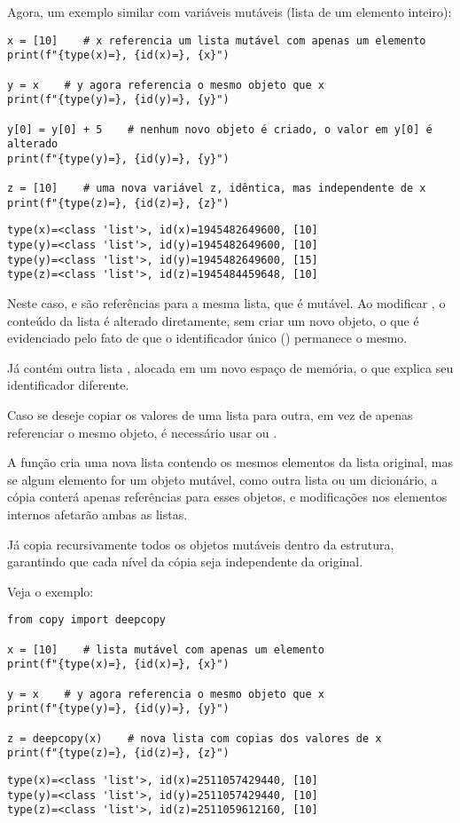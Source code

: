 Agora, um exemplo similar com variáveis mutáveis (lista de um elemento inteiro):
\begin{verbatim}
x = [10]    # x referencia um lista mutável com apenas um elemento
print(f"{type(x)=}, {id(x)=}, {x}")

y = x    # y agora referencia o mesmo objeto que x
print(f"{type(y)=}, {id(y)=}, {y}")

y[0] = y[0] + 5    # nenhum novo objeto é criado, o valor em y[0] é alterado
print(f"{type(y)=}, {id(y)=}, {y}")

z = [10]    # uma nova variável z, idêntica, mas independente de x
print(f"{type(z)=}, {id(z)=}, {z}")
\end{verbatim}
\begin{verbatim}
type(x)=<class 'list'>, id(x)=1945482649600, [10]
type(y)=<class 'list'>, id(y)=1945482649600, [10]
type(y)=<class 'list'>, id(y)=1945482649600, [15]
type(z)=<class 'list'>, id(z)=1945484459648, [10]
\end{verbatim}

Neste caso,  e  são referências para a mesma lista, que é mutável.
Ao modificar , o conteúdo da lista é alterado diretamente, sem criar um novo objeto, o que é evidenciado
pelo fato de que o identificador único () permanece o mesmo.

Já  contém outra lista \inlcode{[10]}, alocada em um novo espaço de memória, o que explica seu
identificador diferente.

Caso se deseje copiar os valores de uma lista para outra, em vez de apenas referenciar o mesmo objeto,
é necessário usar  ou .

A função  cria uma nova lista contendo os mesmos elementos da lista original, mas se algum elemento
for um objeto mutável, como outra lista ou um dicionário, a cópia conterá apenas referências para esses objetos, e
modificações nos elementos internos afetarão ambas as listas.

Já  copia recursivamente todos os objetos mutáveis dentro da estrutura, garantindo que cada
nível da cópia seja independente da original.

Veja o exemplo:
\begin{verbatim}
from copy import deepcopy

x = [10]    # lista mutável com apenas um elemento
print(f"{type(x)=}, {id(x)=}, {x}")

y = x    # y agora referencia o mesmo objeto que x
print(f"{type(y)=}, {id(y)=}, {y}")

z = deepcopy(x)    # nova lista com copias dos valores de x
print(f"{type(z)=}, {id(z)=}, {z}")
\end{verbatim}
\begin{verbatim}
type(x)=<class 'list'>, id(x)=2511057429440, [10]
type(y)=<class 'list'>, id(y)=2511057429440, [10]
type(z)=<class 'list'>, id(z)=2511059612160, [10]
\end{verbatim}


